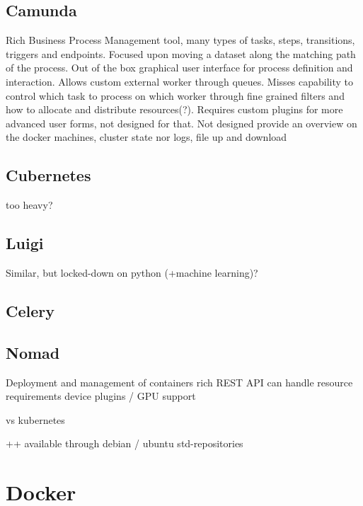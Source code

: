 \subsection{Camunda}

\cite{camunda:main}
\cite{camunda:process_engine_api}
\cite{camunda:rest_api_reference}

Rich Business Process Management tool, many types of tasks, steps, transitions, triggers and endpoints.
Focused upon moving a dataset along the matching path of the process.
Out of the box graphical user interface for process definition and interaction.
Allows custom external worker through queues.
Misses capability to control which task to process on which worker through fine grained filters and how to allocate and distribute resources(?).
Requires custom plugins for more advanced user forms, not designed for that.
Not designed provide an overview on the docker machines, cluster state nor logs, file up and download

\subsection{Cubernetes}

too heavy?

\subsection{Luigi}

Similar, but locked-down on python  (+machine learning)?
\cite{luigi:etc:distributed_pipelines}

\subsection{Celery}

\cite{celery:main}

\subsection{Nomad}


\cite{nomad:main}
Deployment and management of containers
rich REST API
can handle resource requirements
device plugins / GPU support

vs kubernetes \cite{nomad:vs:kubernetes}

++ available through debian / ubuntu std-repositories

\section{Docker}
